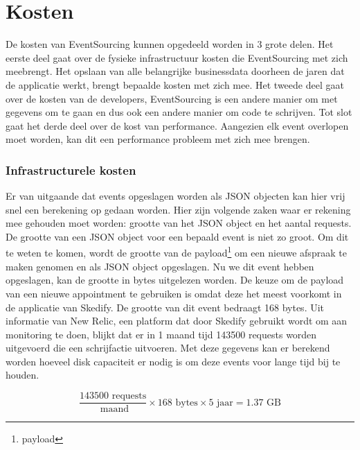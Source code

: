 
\chapter{Kosten}
\label{ch:kosten}

De kosten van EventSourcing kunnen opgedeeld worden in 3 grote delen. Het eerste deel gaat over de fysieke infrastructuur kosten die EventSourcing met zich meebrengt. Het opslaan van alle belangrijke businessdata doorheen de jaren dat de applicatie werkt, brengt bepaalde kosten met zich mee. Het tweede deel gaat over de kosten van de developers, EventSourcing is een andere manier om met gegevens om te gaan en dus ook een andere manier om code te schrijven. Tot slot gaat het derde deel over de kost van performance. Aangezien elk event overlopen moet worden, kan dit een performance probleem met zich mee brengen.

\subsection{Infrastructurele kosten}
\label{subsec:infrastructurele-kosten}

Er van uitgaande dat events opgeslagen worden als \gls{JSON} objecten kan hier vrij snel een berekening op gedaan worden. Hier zijn volgende zaken waar er rekening mee gehouden moet worden: grootte van het \gls{JSON} object en het aantal requests.
De grootte van een \gls{JSON} object voor een bepaald event is niet zo groot. Om dit te weten te komen, wordt de grootte van de \gls{payload}\footnote{\glsdesc{payload}} om een nieuwe afspraak te maken genomen en als \gls{JSON} object opgeslagen. Nu we dit event hebben opgeslagen, kan de grootte in bytes uitgelezen worden. De keuze om de payload van een nieuwe appointment te gebruiken is omdat deze het meest voorkomt in de applicatie van Skedify. De grootte van dit event bedraagt 168 bytes.
Uit informatie van New Relic, een platform dat door Skedify gebruikt wordt om aan monitoring te doen, blijkt dat er in 1 maand tijd 143500 requests worden uitgevoerd die een schrijfactie uitvoeren.
Met deze gegevens kan er berekend worden hoeveel disk capaciteit er nodig is om deze events voor lange tijd bij te houden.

\begin{equation} \label{eq:disk-capaciteit}
\frac{143 500 \text{ requests}}{\text{ maand}} \times 168 \text{ bytes} \times 5 \text{ jaar} = 1.37 \text{ GB} 
\end{equation}

